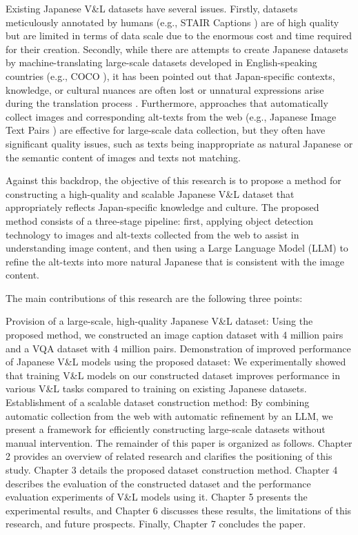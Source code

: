\documentclass[11pt]{article}
\begin{document}
Existing Japanese V\&L datasets have several issues. Firstly, datasets meticulously annotated by humans (e.g., STAIR Captions \cite{吉川友也2017stair}) are of high quality but are limited in terms of data scale due to the enormous cost and time required for their creation. Secondly, while there are attempts to create Japanese datasets by machine-translating large-scale datasets developed in English-speaking countries (e.g., COCO \cite{lin2014microsoft}), it has been pointed out that Japan-specific contexts, knowledge, or cultural nuances are often lost or unnatural expressions arise during the translation process \cite{sasagawa2024constructing}. Furthermore, approaches that automatically collect images and corresponding alt-texts from the web (e.g., Japanese Image Text Pairs \cite{sasagawa2024constructing}) are effective for large-scale data collection, but they often have significant quality issues, such as texts being inappropriate as natural Japanese or the semantic content of images and texts not matching.

Against this backdrop, the objective of this research is to propose a method for constructing a high-quality and scalable Japanese V\&L dataset that appropriately reflects Japan-specific knowledge and culture. The proposed method consists of a three-stage pipeline: first, applying object detection technology to images and alt-texts collected from the web to assist in understanding image content, and then using a Large Language Model (LLM) to refine the alt-texts into more natural Japanese that is consistent with the image content.

The main contributions of this research are the following three points:

Provision of a large-scale, high-quality Japanese V\&L dataset: Using the proposed method, we constructed an image caption dataset with 4 million pairs and a VQA dataset with 4 million pairs.
Demonstration of improved performance of Japanese V\&L models using the proposed dataset: We experimentally showed that training V\&L models on our constructed dataset improves performance in various V\&L tasks compared to training on existing Japanese datasets.
Establishment of a scalable dataset construction method: By combining automatic collection from the web with automatic refinement by an LLM, we present a framework for efficiently constructing large-scale datasets without manual intervention.
The remainder of this paper is organized as follows. Chapter 2 provides an overview of related research and clarifies the positioning of this study. Chapter 3 details the proposed dataset construction method. Chapter 4 describes the evaluation of the constructed dataset and the performance evaluation experiments of V\&L models using it. Chapter 5 presents the experimental results, and Chapter 6 discusses these results, the limitations of this research, and future prospects. Finally, Chapter 7 concludes the paper.
\end{document}
